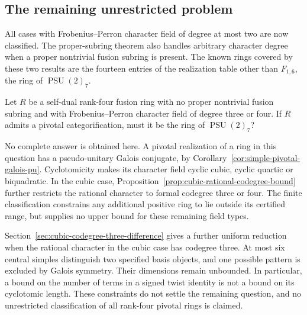 \subsection{The remaining unrestricted problem}
All cases with Frobenius--Perron character field of degree at most two
are now classified. The proper-subring theorem also handles arbitrary
character degree when a proper nontrivial fusion subring is present.
The known rings covered by these two results are the fourteen entries of
the realization table other than $F_{1,6}$, the ring of
$\operatorname{PSU}(2)_7$.

\begin{question}\label{question:unrestricted-simple}
Let $R$ be a self-dual rank-four fusion ring with no proper nontrivial
fusion subring and with Frobenius--Perron character field of degree three
or four. If $R$ admits a pivotal categorification, must it be the ring of
$\operatorname{PSU}(2)_7$?
\end{question}

No complete answer is obtained here. A pivotal realization of a ring in
this question has a pseudo-unitary Galois conjugate, by
Corollary~\ref{cor:simple-pivotal-galois-pu}. Cyclotomicity makes its
character field cyclic cubic, cyclic quartic or biquadratic. In the cubic
case, Proposition~\ref{prop:cubic-rational-codegree-bound} further restricts
the rational character to formal codegree three or four. The finite
classification constrains any additional positive ring to lie outside
its certified range, but supplies no upper bound for these remaining
field types.

Section~\ref{sec:cubic-codegree-three-difference} gives a
further uniform reduction when the rational character in the cubic case
has codegree three. At most six central simples distinguish two specified
basis objects, and one possible pattern is excluded by Galois symmetry.
Their dimensions remain unbounded. In particular, a bound on the number
of terms in a signed twist identity is not a bound on its cyclotomic
length. These constraints do not settle the remaining question, and no
unrestricted classification of all rank-four pivotal rings is claimed.
